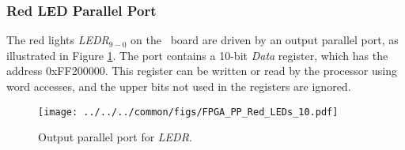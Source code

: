 \subsubsection{Red LED Parallel Port}

The red lights {\it LEDR}$_{9-0}$ on the \DEBoard~board
are driven by an output parallel port, as illustrated in Figure \ref{fig:LED_port}. The port
contains a 10-bit {\it Data} register, which has the
address {\sf 0xFF200000}.  This register can be written or read by the processor using word 
accesses, and the upper bits not used in the registers are ignored.

\begin{figure}[h!]
   \begin{center}
       \texttt{[image: ../../../common/figs/FPGA\_PP\_Red\_LEDs\_10.pdf]}
   \end{center}
   \caption{Output parallel port for {\it LEDR}.}
	\label{fig:LED_port}
\end{figure}


